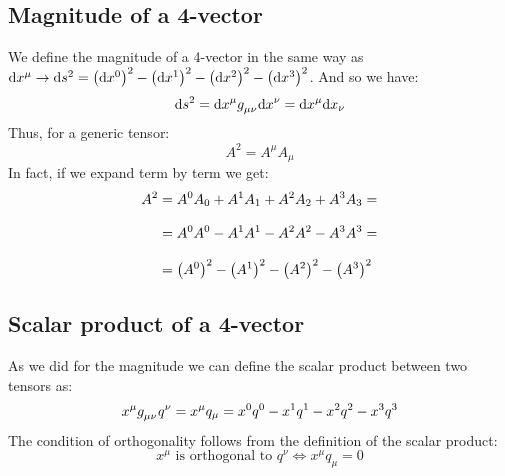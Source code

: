 \subsection{Magnitude of a 4-vector}
We define the magnitude of a 4-vector in the same way as $\mathrm{d}x^{\mu} \rightarrow \mathrm{d}s^2 = \left(\mathrm{d}x^0\right)^2 - \left(\mathrm{d}x^1\right)^2 - \left(\mathrm{d}x^2\right)^2 - \left(\mathrm{d}x^3\right)^2$. And so we have:
\begin{equation}
  \diff{s}^2 = \diff{x}^{\mu} \tensor{g}{_\mu_\nu} \diff{x}^{\nu} = \diff{x}^{\mu} \diff{x}_{\nu}
\end{equation}
Thus, for a generic tensor:
\begin{equation}
  \boxed{A^2 = A^{\mu} A_{\mu}}
\end{equation}
In fact, if we expand term by term we get:
\begin{equation}
  \begin{split}
    A^2 &= A^{0} A_{0} + A^{1} A_{1} + A^{2} A_{2} + A^{3} A_{3} = \\[8pt]
    &= A^{0} A^{0} - A^{1} A^{1} - A^{2} A^{2} - A^{3} A^{3} = \\[8pt]
    &= \left(A^{0}\right)^2 - \left(A^{1}\right)^2 - \left(A^{2}\right)^2 - \left(A^{3}\right)^2
  \end{split}
\end{equation}
\subsection{Scalar product of a 4-vector}
As we did for the magnitude we can define the scalar product between two tensors as:
\begin{equation}
  x^{\mu} \tensor{g}{_\mu_\nu} q^{\nu} = x^{\mu} q_{\mu} = x^{0} q^{0} - x^{1} q^{1} - x^{2} q^{2} -x^{3} q^{3}
\end{equation}
The condition of orthogonality follows from the definition of the scalar product:
\begin{equation}
  x^{\mu} \text{ is orthogonal to } q^{\nu} \iff x^{\mu} q_{\mu} = 0
\end{equation}
